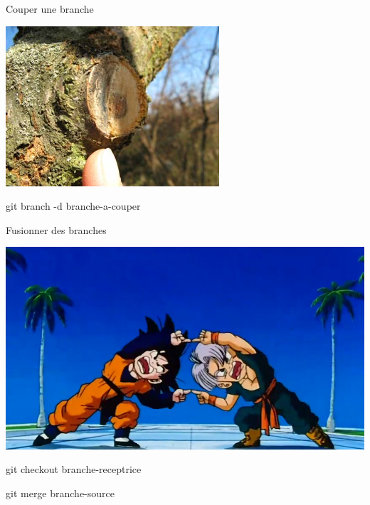 \begin{frame}{Couper une branche}
\begin{center}
\includegraphics[scale=0.7]{scie-collet-branche.jpg}

git branch -d branche-a-couper
\end{center}
\end{frame}

\begin{frame}{Fusionner des branches}
\begin{center}
\includegraphics[scale=0.3]{Goten-Trunks-Fusion-dragon-ball-all-fusion-33379377-855-482.png}

git checkout branche-receptrice

git merge branche-source
\end{center}
\end{frame}

